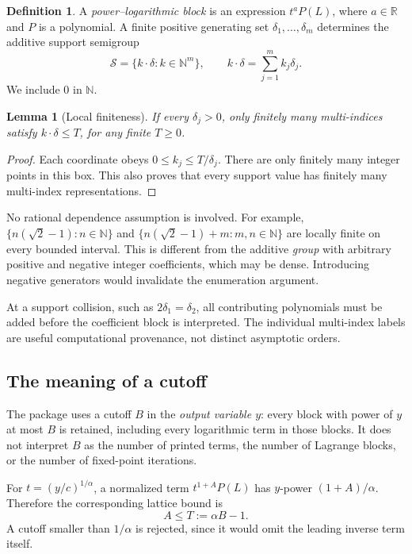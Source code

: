 \documentclass[11pt,a4paper]{article}
\numberwithin{equation}{section}
\newtheorem{lemma}[theorem]{Lemma}
\theoremstyle{definition}\newtheorem{definition}[theorem]{Definition}
\theoremstyle{remark}\newtheorem{remark}[theorem]{Remark}
\newcommand{\R}{\mathbb R}\newcommand{\N}{\mathbb N}
\begin{document}
\begin{definition}
A \emph{power--logarithmic block} is an expression $t^aP(L)$, where $a\in\R$ and $P$ is a polynomial. A finite positive generating set $\delta_1,\ldots,\delta_m$ determines the additive support semigroup
\begin{equation}\label{eq:semigroup}
\mathcal S=\{k\cdot\delta:k\in\N^m\},\qquad
k\cdot\delta=\sum_{j=1}^m k_j\delta_j.
\end{equation}
We include $0$ in $\N$.
\end{definition}

\begin{lemma}[Local finiteness]\label{lem:localfinite}
If every $\delta_j>0$, only finitely many multi-indices satisfy $k\cdot\delta\le T$, for any finite $T\ge0$.
\end{lemma}
\begin{proof}
Each coordinate obeys $0\le k_j\le T/\delta_j$. There are only finitely many integer points in this box. This also proves that every support value has finitely many multi-index representations.
\end{proof}

No rational dependence assumption is involved. For example, $\{n(\sqrt2-1):n\in\N\}$ and $\{n(\sqrt2-1)+m:m,n\in\N\}$ are locally finite on every bounded interval. This is different from the additive \emph{group} with arbitrary positive and negative integer coefficients, which may be dense. Introducing negative generators would invalidate the enumeration argument.

At a support collision, such as $2\delta_1=\delta_2$, all contributing polynomials must be added before the coefficient block is interpreted. The individual multi-index labels are useful computational provenance, not distinct asymptotic orders.

\subsection{The meaning of a cutoff}
The package uses a cutoff $B$ in the \emph{output variable $y$}: every block with power of $y$ at most $B$ is retained, including every logarithmic term in those blocks. It does not interpret $B$ as the number of printed terms, the number of Lagrange blocks, or the number of fixed-point iterations.

For $t=(y/c)^{1/\alpha}$, a normalized term $t^{1+A}P(L)$ has $y$-power $(1+A)/\alpha$. Therefore the corresponding lattice bound is
\begin{equation}\label{eq:cutoff}
A\le T:=\alpha B-1.
\end{equation}
A cutoff smaller than $1/\alpha$ is rejected, since it would omit the leading inverse term itself.
\end{document}
